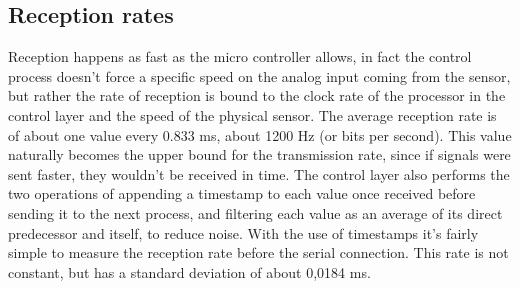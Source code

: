 \subsection{Reception rates}
\label{recrates}
Reception happens as fast as the micro controller allows, in fact the control process doesn't force a specific speed on the analog input coming from the sensor, but rather the rate of reception is bound to the clock rate of the processor in the control layer and the speed of the physical sensor.
The average reception rate is of about one value every 0.833 ms, about 1200 Hz (or bits per second).
This value naturally becomes the upper bound for the transmission rate, since if signals were sent faster, they wouldn't be received in time. 
The control layer also performs the two operations of appending a timestamp to each value once received before sending it to the next process, and filtering each value as an average of its direct predecessor and itself, to reduce noise.
With the use of timestamps it's fairly simple to measure the reception rate before the serial connection.
This rate is not constant, but has a standard deviation of about 0,0184 ms.

